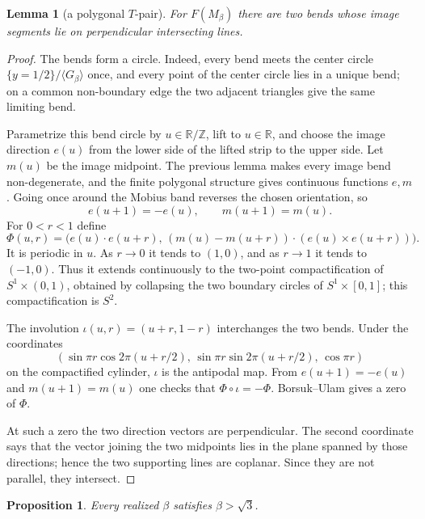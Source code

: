 \documentclass[12pt]{article}
\newtheorem{lemma}{Lemma}
\newtheorem{proposition}{Proposition}
\newcommand{\R}{\mathbb R}
\newcommand{\Z}{\mathbb Z}
\begin{document}
\begin{lemma}[a polygonal \(T\)-pair]\label{lem:T}
For \(F(M_\beta)\) there are two bends whose image segments lie on
perpendicular intersecting lines.
\end{lemma}

\begin{proof}
The bends form a circle.  Indeed, every bend meets the center circle
\(\{y=1/2\}/\langle G_\beta\rangle\) once, and every point of the center
circle lies in a unique bend; on a common non-boundary edge the two
adjacent triangles give the same limiting bend.

Parametrize this bend circle by \(u\in\R/\Z\), lift to \(u\in\R\), and
choose the image direction \(e(u)\) from the lower side of the lifted
strip to the upper side.  Let \(m(u)\) be the image midpoint.  The
previous lemma makes every image bend non-degenerate, and the finite
polygonal structure gives continuous functions \(e,m\).  Going once
around the Mobius band reverses the chosen orientation, so
\[
        e(u+1)=-e(u),\qquad m(u+1)=m(u).
\]
For \(0<r<1\) define
\[
 \Phi(u,r)=\Big(e(u)\!\cdot e(u+r),\,
 (m(u)-m(u+r))\!\cdot (e(u)\times e(u+r))\Big).
\]
It is periodic in \(u\).  As \(r\to0\) it tends to \((1,0)\), and as
\(r\to1\) it tends to \((-1,0)\).  Thus it extends continuously to the
two-point compactification of \(S^1\times(0,1)\), obtained by collapsing
the two boundary circles of \(S^1\times[0,1]\); this compactification is
\(S^2\).

The involution \(\iota(u,r)=(u+r,1-r)\) interchanges the two bends.  Under
the coordinates
\[
(\sin\pi r\cos 2\pi(u+r/2),\,\sin\pi r\sin 2\pi(u+r/2),\,\cos\pi r)
\]
on the compactified cylinder, \(\iota\) is the antipodal map.  From
\(e(u+1)=-e(u)\) and \(m(u+1)=m(u)\) one checks that
\(\Phi\circ\iota=-\Phi\).  Borsuk--Ulam gives a zero of \(\Phi\).

At such a zero the two direction vectors are perpendicular.  The second
coordinate says that the vector joining the two midpoints lies in the
plane spanned by those directions; hence the two supporting lines are
coplanar.  Since they are not parallel, they intersect.
\end{proof}

\begin{proposition}\label{prop:lower}
Every realized \(\beta\) satisfies \(\beta>\sqrt3\).
\end{proposition}
\end{document}
